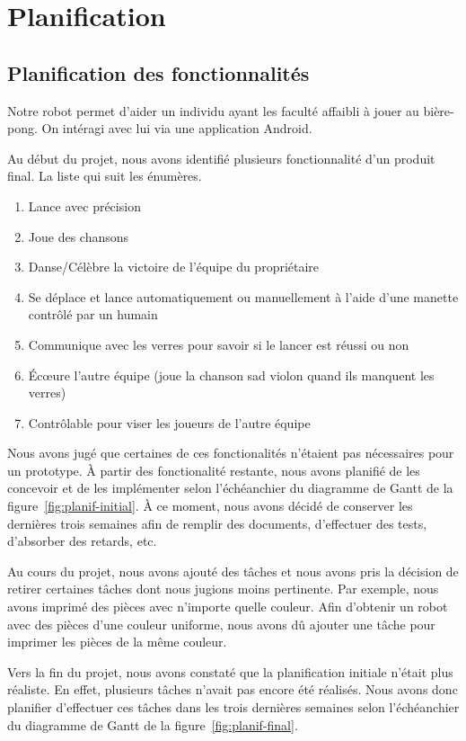 \section{Planification}

\subsection{Planification des fonctionnalités}

Notre robot permet d'aider un individu ayant les faculté affaibli à jouer au bière-pong.
On intéragi avec lui via une application Android.

Au début du projet, nous avons identifié plusieurs fonctionnalité d'un produit final.
La liste qui suit les énumères.

\begin{enumerate}
    \item Lance avec précision
    \item Joue des chansons
    \item Danse/Célèbre la victoire de l’équipe du propriétaire
    \item Se déplace et lance automatiquement ou manuellement à l’aide d’une manette contrôlé par un humain
    \item Communique avec les verres pour savoir si le lancer est réussi ou non
    \item Écœure l’autre équipe (joue la chanson sad violon quand ils manquent les verres)
    \item Contrôlable pour viser les joueurs de l’autre équipe
\end{enumerate}

Nous avons jugé que certaines de ces fonctionalités n'étaient pas nécessaires pour un prototype.
À partir des fonctionalité restante, nous avons planifié de les concevoir et de les implémenter selon l'échéanchier du diagramme de Gantt de la figure~\ref{fig:planif-initial}.
À ce moment, nous avons décidé de conserver les dernières trois semaines afin de remplir des documents, d'effectuer des tests, d'absorber des retards, etc.

Au cours du projet, nous avons ajouté des tâches et nous avons pris la décision de retirer certaines tâches dont nous jugions moins pertinente.
Par exemple, nous avons imprimé des pièces avec n'importe quelle couleur.
Afin d'obtenir un robot avec des pièces d'une couleur uniforme, nous avons dû ajouter une tâche pour imprimer les pièces de la même couleur.

Vers la fin du projet, nous avons constaté que la planification initiale n'était plus réaliste.
En effet, plusieurs tâches n'avait pas encore été réalisés.
Nous avons donc planifier d'effectuer ces tâches dans les trois dernières semaines selon l'échéanchier du diagramme de Gantt de la figure~\ref{fig:planif-final}.

